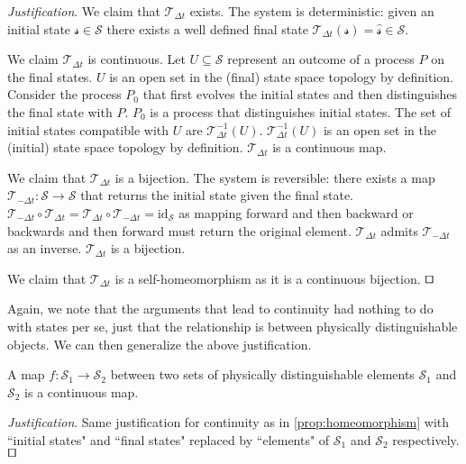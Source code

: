 \documentclass[smallextended]{svjour3}
\numberwithin{equation}{section}
\newenvironment{justification}{\emph{Justification}.}{\hfill\(\qed\)}
\newcommand{\id}{\textrm{id}}
\begin{document}
\begin{justification}
We claim that $\mathcal{T}_{\Delta t}$ exists. The system is deterministic: given an initial state $\mathcal{s} \in \mathcal{S}$ there exists a well defined final state $\mathcal{T}_{\Delta t}(\mathcal{s})=\hat{\mathcal{s}} \in \mathcal{S}$.

We claim $\mathcal{T}_{\Delta t}$ is continuous. Let $U \subseteq \mathcal{S}$ represent an outcome of a process $P$ on the final states. $U$ is an open set in the (final) state space topology by definition. Consider the process $P_0$ that first evolves the initial states and then distinguishes the final state with $P$. $P_0$ is a process that distinguishes initial states. The set of initial states compatible with $U$ are $\mathcal{T}_{\Delta t}^{-1}(U)$. $\mathcal{T}_{\Delta t}^{-1}(U)$ is an open set in the (initial) state space topology by definition. $\mathcal{T}_{\Delta t}$ is a continuous map.

We claim that $\mathcal{T}_{\Delta t}$ is a bijection. The system is reversible: there exists a map $\mathcal{T}_{-\Delta t}:\mathcal{S} \rightarrow \mathcal{S}$ that returns the initial state given the final state. $\mathcal{T}_{-\Delta t} \circ \mathcal{T}_{\Delta t} = \mathcal{T}_{\Delta t} \circ \mathcal{T}_{-\Delta t} = \id_{\mathcal{S}}$ as mapping forward and then backward or backwards and then forward must return the original element. $\mathcal{T}_{\Delta t}$ admits $\mathcal{T}_{-\Delta t}$ as an inverse. $\mathcal{T}_{\Delta t}$ is a bijection.

We claim that $\mathcal{T}_{\Delta t}$ is a self-homeomorphism as it is a continuous bijection.
\end{justification}

Again, we note that the arguments that lead to continuity had nothing to do with states per se, just that the relationship is between physically distinguishable objects. We can then generalize the above justification.

\begin{prop}\label{prop:continuity}
	A map $f:\mathcal{S_1} \rightarrow \mathcal{S_2}$ between two sets of physically distinguishable elements $\mathcal{S_1}$ and $\mathcal{S_2}$ is a continuous map.
\end{prop}

\begin{justification}
	Same justification for continuity as in \ref{prop:homeomorphism} with ``initial states" and ``final states" replaced by ``elements" of $\mathcal{S_1}$ and $\mathcal{S_2}$ respectively.
\end{justification}
\end{document}
